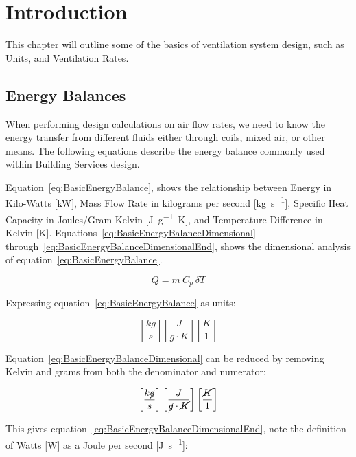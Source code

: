 \chapter{Introduction}
\label{chp:Vintro}

This chapter will outline some of the basics of ventilation system design, such as \hyperref[sec:Units]{Units}, and \hyperref[sec:ventRates]{Ventilation Rates.}

\section{Energy Balances}
\label{sec:EnergyBalances}

When performing design calculations on air flow rates, we need to know the energy transfer from different fluids either through coils, mixed air, or other means.  The following equations describe the energy balance commonly used within Building Services design.

Equation~\ref{eq:BasicEnergyBalance}, shows the relationship between Energy in Kilo-Watts [\si{\kilo\watt}], Mass Flow Rate in kilograms per second [\si{\kilo\gram\per\second}], Specific Heat Capacity in Joules/Gram-Kelvin [\si{\joule\per\gram\kelvin}], and Temperature Difference in Kelvin [\si{\kelvin}].  Equations~\ref{eq:BasicEnergyBalanceDimensional} through~\ref{eq:BasicEnergyBalanceDimensionalEnd}, shows the dimensional analysis of equation~\ref{eq:BasicEnergyBalance}.

\begin{equation}\label{eq:BasicEnergyBalance}
Q = m~C_p~\delta T
\end{equation}

Expressing equation~\ref{eq:BasicEnergyBalance} as units:

\begin{equation}\label{eq:BasicEnergyBalanceDimensional}
\left[ \frac{kg}{s} \right] \left[ \frac{J}{g\cdot K} \right] \left[ \frac{K}{1} \right]
\end{equation}

Equation~\ref{eq:BasicEnergyBalanceDimensional} can be reduced by removing Kelvin and grams from both the denominator and numerator:

\begin{equation}
\left[ \frac{k\cancel{g}}{s} \right] \left[ \frac{J}{\cancel{g} \cdot \cancel{K}} \right] \left[ \frac{\cancel{K}}{1} \right]
\end{equation}

This gives equation~\ref{eq:BasicEnergyBalanceDimensionalEnd}, note the definition of Watts [\si{\watt}] as a Joule per second [\si{\joule\per\second}]:


